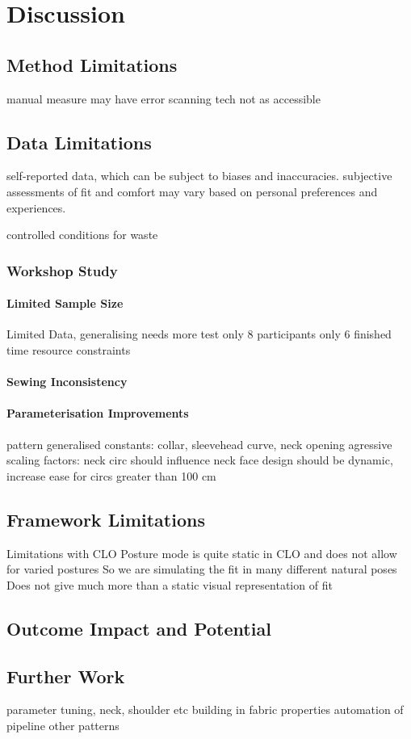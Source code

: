 \chapter{Discussion}

\section{Method Limitations}
manual measure may have error
scanning tech not as accessible

\section{Data Limitations}
self-reported data, which can be subject to biases and inaccuracies. subjective assessments of fit and comfort may vary based on personal preferences and experiences. 

controlled conditions for waste

\subsection{Workshop Study}
\subsubsection{Limited Sample Size}
Limited Data, generalising needs more test
only 8 participants only 6 finished
time resource constraints
\subsubsection{Sewing Inconsistency}


\subsubsection{Parameterisation Improvements}
pattern generalised
constants: collar, sleevehead curve, neck opening
agressive scaling factors:
neck circ should influence neck face
design should be dynamic, increase ease for circs greater than 100 cm

\section{Framework Limitations}
Limitations with CLO
Posture mode is quite static in CLO and does not allow for varied postures
So we are simulating the fit in many different natural poses
Does not give much more than a static visual representation of fit

\section{Outcome Impact and Potential}

\section{Further Work}

parameter tuning, neck, shoulder etc
building in fabric properties
automation of pipeline
other patterns